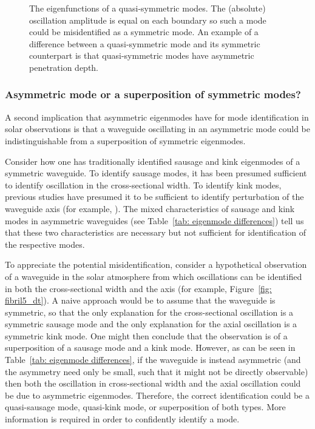 \begin{figure}
{{
		\label{fig: quasi-sym kink}
		}
	}
	\caption{The eigenfunctions of a quasi-symmetric modes. The (absolute) oscillation amplitude is equal on each boundary so such a mode could be misidentified as a symmetric mode. An example of a difference between a quasi-symmetric mode and its symmetric counterpart is that quasi-symmetric modes have asymmetric penetration depth.}
	\label{fig: quasi-sym}
\end{figure}


\subsubsection{Asymmetric mode or a superposition of symmetric modes?}

A second implication that asymmetric eigenmodes have for mode identification in solar observations is that a waveguide oscillating in an asymmetric mode could be indistinguishable from a superposition of symmetric eigenmodes.

Consider how one has traditionally identified sausage and kink eigenmodes of a symmetric waveguide. To identify sausage modes, it has been presumed sufficient to identify oscillation in the cross-sectional width. To identify kink modes, previous studies have presumed it to be sufficient to identify perturbation of the waveguide axis (for example, \citealp{mor_etal12}). The mixed characteristics of sausage and kink modes in asymmetric waveguides (see Table~\ref{tab: eigenmode differences}) tell us that these two characteristics are necessary but not sufficient for identification of the respective modes.

To appreciate the potential misidentification, consider a hypothetical observation of a waveguide in the solar atmosphere from which oscillations can be identified in both the cross-sectional width and the axis (for example, Figure~\ref{fig: fibril5_dt}). A naive approach would be to assume that the waveguide is symmetric, so that the only explanation for the cross-sectional oscillation is a symmetric sausage mode and the only explanation for the axial oscillation is a symmetric kink mode. One might then conclude that the observation is of a superposition of a sausage mode and a kink mode. However, as can be seen in Table~\ref{tab: eigenmode differences}, if the waveguide is instead asymmetric (and the asymmetry need only be small, such that it might not be directly observable) then both the oscillation in cross-sectional width and the axial oscillation could be due to asymmetric eigenmodes. Therefore, the correct identification could be a quasi-sausage mode, quasi-kink mode, or superposition of both types. More information is required in order to confidently identify a mode.

